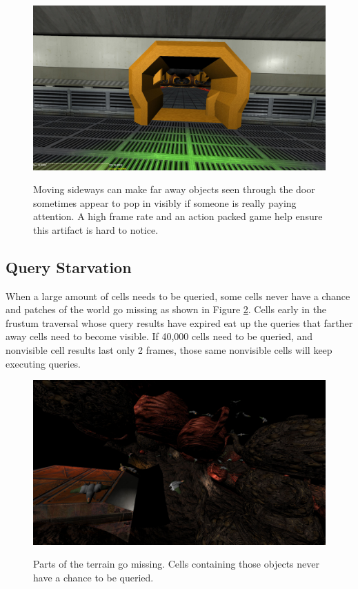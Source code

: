\documentclass[12pt]{ucthesis}
\newcommand{\captionfonts}{\small\bf\ssp}
\begin{document}
\begin{figure}
\begin{center}
\includegraphics[width=\textwidth]{Images/HallDoorway.jpg}
\captionfonts
\caption[Hall Doorway]{Moving sideways can make far away objects seen through the door sometimes appear to pop in visibly if someone is really paying attention.
A high frame rate and an action packed game help ensure this artifact is hard to notice.}
\label{fig:hall-doorway}
\end{center}
\end{figure}

\subsection {Query Starvation}
\label{query-starvation}

When a large amount of cells needs to be queried, some cells never have a chance and patches of the world go missing as shown in Figure \ref{fig:missing-patches}.
Cells early in the frustum traversal whose query results have expired eat up the queries that farther away cells need to become visible.
If 40,000 cells need to be queried, and nonvisible cell results last only 2 frames, those same nonvisible cells will keep executing queries.

\begin{figure}
\begin{center}
\includegraphics[width=\textwidth]{Images/MissingPatches.jpg}
\captionfonts
\caption[Missing patches]{Parts of the terrain go missing. Cells containing those objects never have a chance to be queried.}
\label{fig:missing-patches}
\end{center}
\end{figure}
\end{document}
